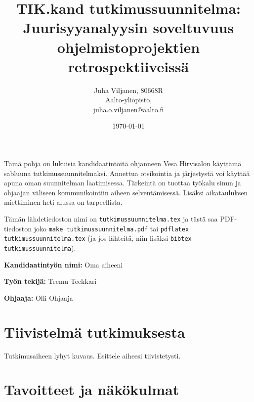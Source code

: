\documentclass[12pt,a4paper,finnish,oneside]{article}
\begin{document}

\title{TIK.kand tutkimussuunnitelma:\\[5mm]
Juurisyyanalyysin soveltuvuus ohjelmistoprojektien retrospektiiveissä}

\author{Juha Viljanen, 80668R\\
Aalto-yliopisto,\\
\url{juha.o.viljanen@aalto.fi}}

\date{\today}

\maketitle


Tämä pohja on lukuisia kandidaatintöitä ohjanneen Vesa Hirvisalon
käyttämä sabluuna tutkimussuunnitelmaksi.  Annettua otsikointia ja
järjestystä voi käyttää apuna oman suunnitelman laatimisessa.
Tärkeintä on tuottaa työkalu sinun ja ohjaajan väliseen
kommunikointiin aiheen selventämisessä. Lisäksi aikatauluksen
miettiminen heti alussa on tarpeellista.

Tämän lähdetiedoston nimi on \verb!tutkimussuunnitelma.tex! ja tästä
saa PDF-tiedoston joko \verb!make tutkimussuunnitelma.pdf! tai
\verb!pdflatex tutkimussuunnitelma.tex! (ja jos lähteitä, niin lisäksi
\verb!bibtex tutkimussuunnitelma!).  

\vspace{10mm}

%

\textbf{Kandidaatintyön nimi:} Oma aiheeni

\textbf{Työn tekijä:} Teemu Teekkari

\textbf{Ohjaaja:} Olli Ohjaaja


\section{Tiivistelmä tutkimuksesta}

Tutkimusaiheen lyhyt kuvaus. Esittele aiheesi tiivistetysti.

\section{Tavoitteet ja näkökulmat}
\end{document}
